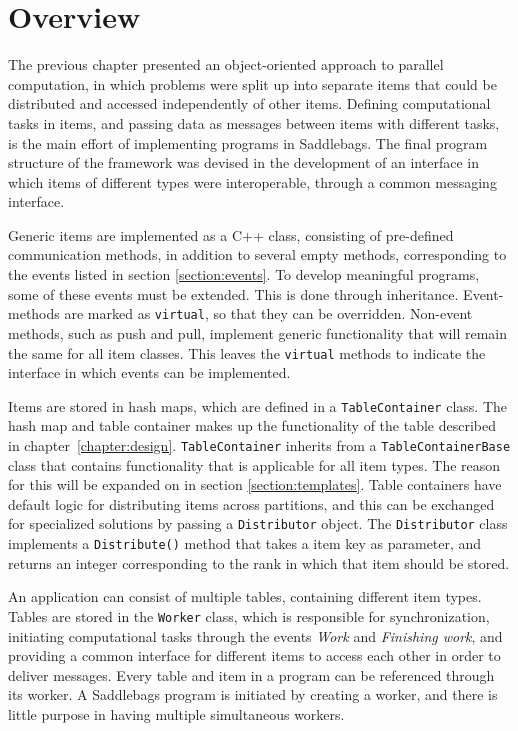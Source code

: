 \documentclass{uit-report}
\begin{document}
\section{Overview}
The previous chapter presented an object-oriented approach to parallel computation, in which problems were split up into separate items that could be distributed and accessed independently of other items. Defining computational tasks in items, and passing data as messages between items with different tasks, is the main effort of implementing programs in Saddlebags. The final program structure of the framework was devised in the development of an interface in which items of different types were interoperable, through a common messaging interface.

Generic items are implemented as a C++ class, consisting of pre-defined communication methods, in addition to several empty methods, corresponding to the events listed in section \ref{section:events}. To develop meaningful programs, some of these events must be extended. This is done through inheritance. Event-methods are marked as \texttt{virtual}, so that they can be overridden. Non-event methods, such as push and pull, implement generic functionality that will remain the same for all item classes. This leaves the \texttt{virtual} methods to indicate the interface in which events can be implemented. 

Items are stored in hash maps, which are defined in a \texttt{TableContainer} class. The hash map and table container makes up the functionality of the table described in chapter~\ref{chapter:design}. \texttt{TableContainer} inherits from a \texttt{TableContainerBase} class that contains functionality that is applicable for all item types. The reason for this will be expanded on in section \ref{section:templates}. Table containers have default logic for distributing items across partitions, and this can be exchanged for specialized solutions by passing a \texttt{Distributor} object. The \texttt{Distributor} class implements a \texttt{Distribute()} method that takes a item key as parameter, and returns an integer corresponding to the rank in which that item should be stored. 

An application can consist of multiple tables, containing different item types. Tables are stored in the \texttt{Worker} class, which is responsible for synchronization, initiating computational tasks through the events \emph{Work} and \emph{Finishing work}, and providing a common interface for different items to access each other in order to deliver messages. Every table and item in a program can be referenced through its worker. A Saddlebags program is initiated by creating a worker, and there is little purpose in having multiple simultaneous workers.
\end{document}
